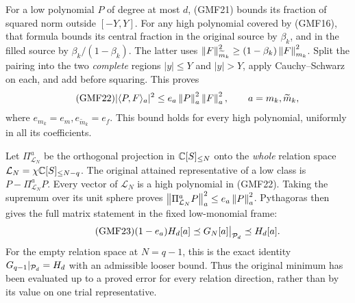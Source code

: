 \documentclass[11pt,a4paper]{article}
\begin{document}
For a low polynomial \(P\) of degree at most \(d\), (GMF21)
bounds its fraction of squared norm outside \([-Y,Y]\).
For any high polynomial covered by (GMF16), that formula
bounds its central fraction in the original source by
\(\beta_k\), and in the filled source by
\(\beta_k/(1-\beta_k)\).
The latter uses
\(\left\lVert F\right\rVert_{\widetilde m_k}^2\ge(1-\beta_k)\left\lVert F\right\rVert_{m_k}^2\).
Split the pairing into the two \emph{complete} regions
\(|y|\le Y\) and \(|y|>Y\), apply Cauchy--Schwarz on each,
and add before squaring.  This proves
\begin{equation}\tag{GMF22}
 |\langle P,F\rangle_a|^2
 \le e_a\left\lVert P\right\rVert_a^2\left\lVert F\right\rVert_a^2,\qquad
 a=m_k,\widetilde m_k,
\end{equation}
where \(e_{m_k}=e_m,e_{\widetilde m_k}=e_f\).
This bound holds for every high polynomial, uniformly in all
its coefficients.

Let \(\Pi_{\mathcal L_N}^a\) be the orthogonal projection in
\(\mathbb C[S]_{\le N}\) onto the \emph{whole} relation space
\(\mathcal L_N=\chi\mathbb C[S]_{\le N-q}\).
The original attained representative of a low class is
\(P-\Pi_{\mathcal L_N}^aP\).
Every vector of \(\mathcal L_N\) is a high polynomial in
(GMF22).  Taking the supremum over its unit sphere proves
\(\left\lVert\Pi_{\mathcal L_N}^aP\right\rVert_a^2\le e_a\left\lVert P\right\rVert_a^2\).
Pythagoras then gives the full matrix statement in the
fixed low-monomial frame:
\begin{equation}\tag{GMF23}
 (1-e_a)H_d[a]\preceq G_N[a]\big|_{\mathcal P_d}
                         \preceq H_d[a].
\end{equation}
For the empty relation space at \(N=q-1\), this is the
exact identity \(G_{q-1}|_{\mathcal P_d}=H_d\) with an admissible
looser bound.  Thus the original minimum has been evaluated
up to a proved error for every relation direction, rather
than by its value on one trial representative.
\end{document}
